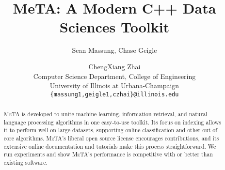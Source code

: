 \documentclass[11pt]{article}
\title{MeTA: A Modern C++ Data Sciences Toolkit} %
\author{Sean Massung, Chase Geigle \and ChengXiang Zhai \\
            Computer Science Department, College of Engineering \\
            University of Illinois at Urbana-Champaign \\
            {\tt \{massung1,geigle1,czhai\}@illinois.edu}
}
\date{}
\def\meta/{\textsc{MeTA}}
\begin{document}
\maketitle

\begin{abstract}
\meta/ is developed to unite machine learning, information retrieval, and
natural language processing algorithms in one easy-to-use toolkit. Its focus
on indexing allows it to perform well on large datasets, supporting online
classification and other out-of-core algorithms. \meta/'s liberal open
source license encourages contributions, and its extensive online
documentation and tutorials make this process straightforward. We run
experiments and show \meta/'s performance is competitive with or better than
existing software.
\end{abstract}






\small


\normalsize
\end{document}

